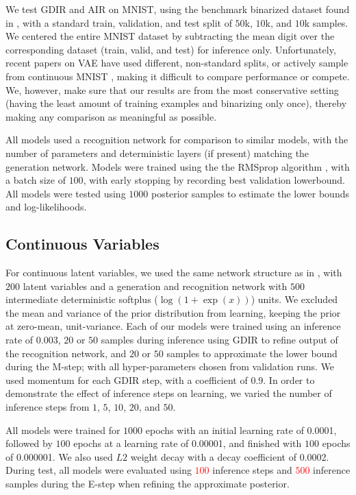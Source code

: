 \documentclass{article} %
\newcommand{\alert}[1]{\textcolor{red}{#1}}
\begin{document}
We test GDIR and AIR on MNIST, using the benchmark binarized dataset found in
\citep{salakhutdinov2008quantitative}, with a standard train, validation, and
test split of $50$k, $10$k, and $10$k samples. We centered the entire MNIST dataset by subtracting the mean digit over the corresponding dataset (train, valid, and test) for inference only. Unfortunately, recent papers on
VAE \citep{mnih2014neural, icml2015_salimans15} have used different, non-standard
splits, or actively sample from continuous MNIST \citep{burda2015importance},
making it difficult to compare performance or compete. We, however, make sure that our results are from
the most conservative setting (having the least amount of training examples and
binarizing only once),
thereby making any comparison as meaningful as possible.

All models used a recognition network for comparison to similar models, with
the number of parameters and deterministic layers (if present) matching the
generation network. Models were trained using the the RMSprop algorithm
\citep{Hinton-Coursera2012}, with a batch size of $100$, with early stopping by
recording best validation lowerbound. All models were tested using $1000$ posterior samples
to estimate the lower bounds and log-likelihoods.

\subsection{Continuous Variables}
For continuous latent variables, we used the same network structure as in
\citep{kingma2013auto, icml2015_salimans15}, with $200$ latent variables and a
generation and recognition network with $500$ intermediate deterministic
softplus ($\log (1 + \exp(x))$) units. We excluded the mean and variance of the prior distribution from learning, keeping the prior at zero-mean, unit-variance.
Each of our models were trained using an inference rate of \num{0.003}, $20$ or $50$ samples
during inference using GDIR to refine output of the recognition network, and
$20$ or $50$ samples to approximate the lower bound during the M-step; with all
hyper-parameters chosen from validation runs. We used momentum for each GDIR step, with a coefficient of $0.9$. In order to demonstrate the effect
of inference steps on learning, we varied the number of inference steps from
$1$, $5$, $10$, $20$, and $50$.

All models were trained for $1000$ epochs with an initial learning
rate of \num{0.0001}, followed by $100$ epochs at a learning rate of \num{0.00001}, and finished with
$100$ epochs of \num{0.000001}. We also used $L2$ weight decay with a decay
coefficient of \num{0.0002}. During test, all models were evaluated using \alert{$100$}
inference steps and \alert{$500$} inference samples during the E-step when refining the approximate posterior.
\end{document}
